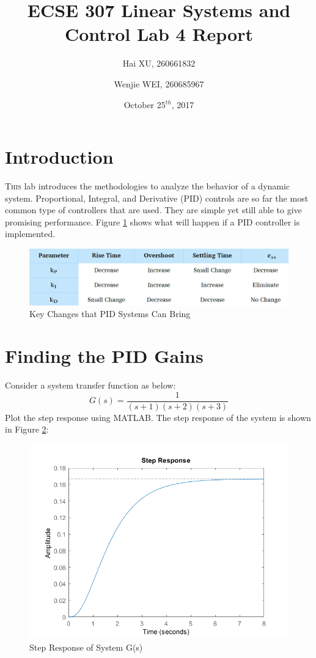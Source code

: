 \documentclass[a4paper, twocolumn, titlepage, 10pt]{article}
\title{\textbf{ECSE 307 Linear Systems and Control} \linebreak Lab 4 Report}
\author{Hai XU, 260661832 \and Wenjie WEI, 260685967}
\date{October 25$^{th}$, 2017}
\begin{document}
	\maketitle
	\section{Introduction}
		\lettrine{T}{his} lab introduces the methodologies to analyze the behavior of a dynamic system. Proportional, Integral, and Derivative (PID) controls are so far the most common type of controllers that are used. They are simple yet still able to give promising performance. Figure \ref{PIDData} shows what will happen if a PID controller is implemented.
		\begin{figure}[H]
			\centering
			\includegraphics[width=\linewidth]{PIDData}
			\caption{Key Changes that PID Systems Can Bring}
			\label{PIDData}
		\end{figure}
	\section{Finding the PID Gains}
		Consider a system transfer function as below:
		\begin{equation}
			G(s) = \frac{1}{(s+1)(s+2)(s+3)} 
			\label{limit}
		\end{equation}
		Plot the step response using MATLAB. The step response of the system is shown in Figure \ref{G_step}:
		\begin{figure}[H]
			\centering
			\includegraphics[width=\linewidth]{G_step}
			\caption{Step Response of System G(s)}
			\label{G_step}
		\end{figure}
		
\end{document}
